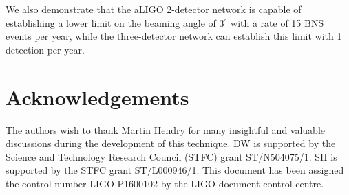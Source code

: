 \documentclass[twocolumn,nofootinbib]{revtex4-1}
\begin{document}
We also demonstrate that the \ac{aLIGO} 2-detector network is
capable of establishing a lower limit on the beaming angle of
$3^{\circ}$ with a rate of 15 BNS events per year, while the
three-detector network can establish this limit with 1 detection per
year.

\section{Acknowledgements}
\label{sec:ackn}
The authors wish to thank Martin Hendry for many insightful and
valuable discussions during the development of this technique. DW is
supported by the Science and Technology Research Council (STFC) grant
ST/N504075/1. SH is supported by the STFC grant ST/L000946/1. This
document has been assigned the control number LIGO-P1600102 by the
LIGO document control centre.


\end{document}
